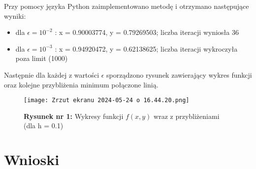 \documentclass{article}
\begin{document}
\noindent
Przy pomocy języka Python zaimplementowano metodę i otrzymano następujące wyniki:
\begin{itemize}
    \item dla $\epsilon = 10^{-2}$ : x = 0.90003774, y = 0.79269503; liczba iteracji wyniosła 36
    \item dla $\epsilon = 10^{-3}$ : x = 0.94920472, y = 0.62138625; liczba iteracji wykroczyła poza limit (1000) 
\end{itemize}

\noindent
Następnie dla każdej z wartości $\epsilon$ sporządzono rysunek zawierający wykres funkcji oraz kolejne przybliżenia minimum połączone linią. 

\begin{figure}[H]
    \centering
    \texttt{[image: Zrzut ekranu 2024-05-24 o 16.44.20.png]}
    \caption{\textbf{Rysunek nr 1:} Wykresy funkcji $f(x,y)$ wraz z przybliżeniami (dla h = 0.1)}
    \label{fig:enter-label}
\end{figure}

\section{Wnioski} %
\end{document}
